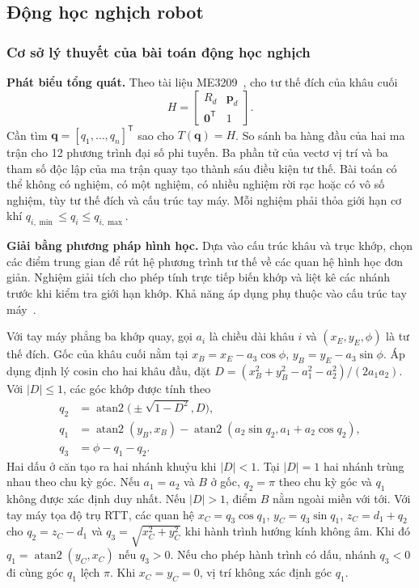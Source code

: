 \subsection{Động học nghịch robot}
\subsubsection*{Cơ sở lý thuyết của bài toán động học nghịch}
\noindent\textbf{Phát biểu tổng quát.}
Theo tài liệu ME3209~\cite[mục 3.2.1, tr.~66--68]{me3209}, cho tư thế đích của khâu cuối
\[
 H=\begin{bmatrix}R_d&\mathbf p_d\\\mathbf 0^{\mathsf T}&1\end{bmatrix}.
\]
Cần tìm \(\mathbf q=[q_1,\ldots,q_n]^{\mathsf T}\) sao cho \(T(\mathbf q)=H\).
So sánh ba hàng đầu của hai ma trận cho 12 phương trình đại số phi tuyến. Ba phần tử của vectơ vị trí và ba tham số độc lập của ma trận quay tạo thành sáu điều kiện tư thế. Bài toán có thể không có nghiệm, có một nghiệm, có nhiều nghiệm rời rạc hoặc có vô số nghiệm, tùy tư thế đích và cấu trúc tay máy. Mỗi nghiệm phải thỏa giới hạn cơ khí \(q_{i,\min}\le q_i\le q_{i,\max}\).

\medskip
\noindent\textbf{Giải bằng phương pháp hình học.}
Dựa vào cấu trúc khâu và trục khớp, chọn các điểm trung gian để rút hệ phương trình tư thế về các quan hệ hình học đơn giản. Nghiệm giải tích cho phép tính trực tiếp biến khớp và liệt kê các nhánh trước khi kiểm tra giới hạn khớp. Khả năng áp dụng phụ thuộc vào cấu trúc tay máy~\cite[mục 3.2.2, tr.~68--70]{me3209}.

Với tay máy phẳng ba khớp quay, gọi \(a_i\) là chiều dài khâu \(i\) và \((x_E,y_E,\phi)\) là tư thế đích. Gốc của khâu cuối nằm tại \(x_B=x_E-a_3\cos\phi\), \(y_B=y_E-a_3\sin\phi\). Áp dụng định lý cosin cho hai khâu đầu, đặt \(D=(x_B^2+y_B^2-a_1^2-a_2^2)/(2a_1a_2)\). Với \(|D|\leq 1\), các góc khớp được tính theo
\begin{align*}
 q_2 &= \operatorname{atan2}\bigl(\pm\sqrt{1-D^2},D\bigr),\\
 q_1 &= \operatorname{atan2}(y_B,x_B)
       -\operatorname{atan2}(a_2\sin q_2,a_1+a_2\cos q_2),\\
 q_3 &= \phi-q_1-q_2 .
\end{align*}
Hai dấu ở căn tạo ra hai nhánh khuỷu khi \(|D|<1\). Tại \(|D|=1\) hai nhánh trùng nhau theo chu kỳ góc. Nếu \(a_1=a_2\) và \(B\) ở gốc, \(q_2=\pi\) theo chu kỳ góc và \(q_1\) không được xác định duy nhất. Nếu \(|D|>1\), điểm \(B\) nằm ngoài miền với tới. Với tay máy tọa độ trụ RTT, các quan hệ \(x_C=q_3\cos q_1\), \(y_C=q_3\sin q_1\), \(z_C=d_1+q_2\) cho \(q_2=z_C-d_1\) và \(q_3=\sqrt{x_C^2+y_C^2}\) khi hành trình hướng kính không âm. Khi đó \(q_1=\operatorname{atan2}(y_C,x_C)\) nếu \(q_3>0\). Nếu cho phép hành trình có dấu, nhánh \(q_3<0\) đi cùng góc \(q_1\) lệch \(\pi\). Khi \(x_C=y_C=0\), vị trí không xác định góc \(q_1\).

